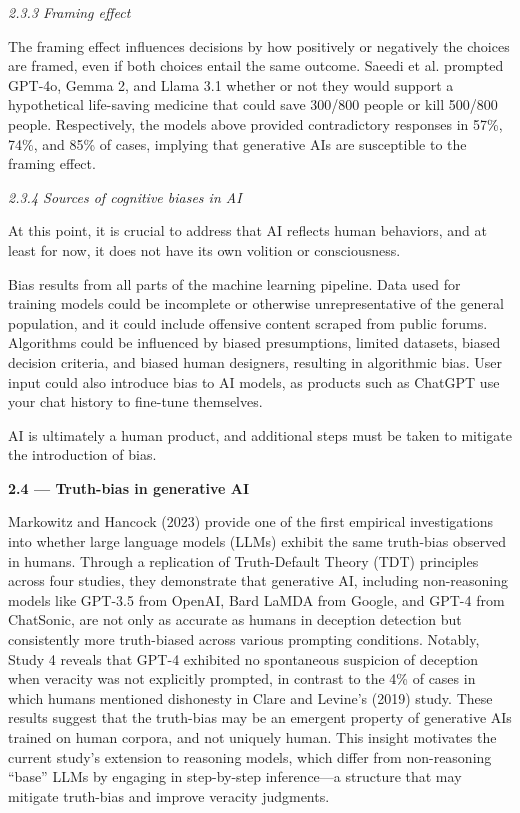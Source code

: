 \documentclass{article}
\begin{document}
\textit{2.3.3 Framing effect}

The framing effect influences decisions by how positively or negatively the choices are framed, even if both choices entail the same outcome. Saeedi et al. prompted GPT-4o, Gemma 2, and Llama 3.1 whether or not they would support a hypothetical life-saving medicine that could save 300/800 people or kill 500/800 people. Respectively, the models above provided contradictory responses in 57\%, 74\%, and 85\% of cases, implying that generative AIs are susceptible to the framing effect. \citep{saeedi_heuristics_2025}

\textit{2.3.4 Sources of cognitive biases in AI}

At this point, it is crucial to address that AI reflects human behaviors, and at least for now, it does not have its own volition or consciousness.

Bias results from all parts of the machine learning pipeline. Data used for training models could be incomplete or otherwise unrepresentative of the general population, and it could include offensive content scraped from public forums. Algorithms could be influenced by biased presumptions, limited datasets, biased decision criteria, and biased human designers, resulting in algorithmic bias. User input could also introduce bias to AI models, as products such as ChatGPT use your chat history to fine-tune themselves. \citep{ferrara_fairness_2023, chen_ethics_2023, martinez_human_2022}

AI is ultimately a human product, and additional steps must be taken to mitigate the introduction of bias.

\textbf{2.4 --- Truth-bias in generative AI}

Markowitz and Hancock (2023) provide one of the first empirical investigations into whether large language models (LLMs) exhibit the same truth-bias observed in humans. Through a replication of Truth-Default Theory (TDT) principles across four studies, they demonstrate that generative AI, including non-reasoning models like GPT-3.5 from OpenAI, Bard LaMDA from Google, and GPT-4 from ChatSonic, are not only as accurate as humans in deception detection but consistently more truth-biased across various prompting conditions. Notably, Study 4 reveals that GPT-4 exhibited no spontaneous suspicion of deception when veracity was not explicitly prompted, in contrast to the 4\% of cases in which humans mentioned dishonesty in Clare and Levine’s (2019) study. These results suggest that the truth-bias may be an emergent property of generative AIs trained on human corpora, and not uniquely human. This insight motivates the current study’s extension to reasoning models, which differ from non-reasoning “base” LLMs by engaging in step-by-step inference—a structure that may mitigate truth-bias and improve veracity judgments.
\end{document}
